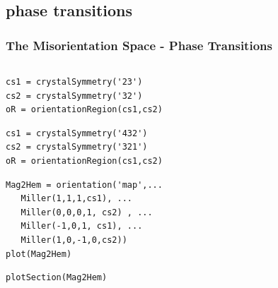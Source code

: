 \documentclass[compress]{beamer}
\begin{document}
\subsection*{phase transitions}

\begin{frame}[fragile]
  \frametitle{The Misorientation Space - Phase Transitions}

  \begin{columns}
    \begin{column}{0.6\textwidth}
      \begin{lstlisting}[style=input]
cs1 = crystalSymmetry('23')
cs2 = crystalSymmetry('32')
oR = orientationRegion(cs1,cs2)
      \end{lstlisting}

      \pause
      \pause
      \begin{lstlisting}[style=input]
cs1 = crystalSymmetry('432')
cs2 = crystalSymmetry('321')
oR = orientationRegion(cs1,cs2)
\end{lstlisting}

      \pause
      \begin{lstlisting}[style=input]
Mag2Hem = orientation('map',...
   Miller(1,1,1,cs1), ...
   Miller(0,0,0,1, cs2) , ...
   Miller(-1,0,1, cs1), ...
   Miller(1,0,-1,0,cs2))
plot(Mag2Hem)
      \end{lstlisting}

      \pause
      \begin{lstlisting}[style=input]
plotSection(Mag2Hem)
\end{lstlisting}



\end{column}
\end{columns}
\end{frame}
\end{document}
